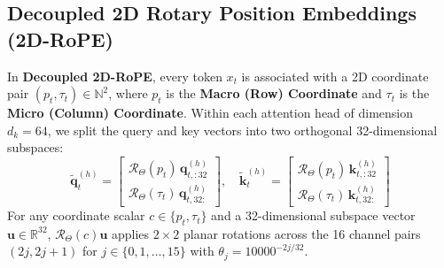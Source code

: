 \documentclass[10pt,twocolumn]{article}
\begin{document}
\subsection{Decoupled 2D Rotary Position Embeddings (2D-RoPE)}

In \textbf{Decoupled 2D-RoPE}, every token $x_t$ is associated with a 2D coordinate pair $(p_t, \tau_t) \in \mathbb{N}^2$, where $p_t$ is the \textbf{Macro (Row) Coordinate} and $\tau_t$ is the \textbf{Micro (Column) Coordinate}. Within each attention head of dimension $d_k = 64$, we split the query and key vectors into two orthogonal 32-dimensional subspaces:
\begin{equation}
\tilde{\mathbf{q}}_{t}^{(h)} = \begin{bmatrix} \mathcal{R}_{\Theta}(p_t)\, \mathbf{q}_{t, :32}^{(h)} \\[4pt] \mathcal{R}_{\Theta}(\tau_t)\, \mathbf{q}_{t, 32:}^{(h)} \end{bmatrix}, \quad
\tilde{\mathbf{k}}_{t}^{(h)} = \begin{bmatrix} \mathcal{R}_{\Theta}(p_t)\, \mathbf{k}_{t, :32}^{(h)} \\[4pt] \mathcal{R}_{\Theta}(\tau_t)\, \mathbf{k}_{t, 32:}^{(h)} \end{bmatrix}
\label{eq:2d_rope}
\end{equation}
For any coordinate scalar $c \in \{p_t, \tau_t\}$ and a 32-dimensional subspace vector $\mathbf{u} \in \mathbb{R}^{32}$, $\mathcal{R}_{\Theta}(c)\mathbf{u}$ applies $2\times 2$ planar rotations across the 16 channel pairs $(2j, 2j+1)$ for $j \in \{0, 1, \dots, 15\}$ with $\theta_j = 10000^{-2j/32}$.
\end{document}
